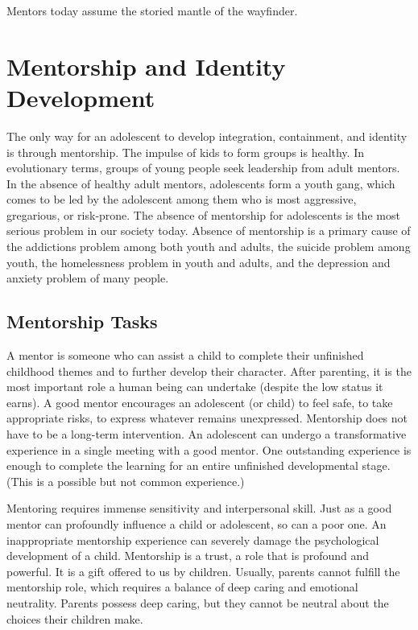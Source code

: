 \documentclass[12pt,DIV9,oneside,headsepline,footsepline]{scrreprt}
\begin{document}
Mentors today assume the storied mantle of the wayfinder. 


\section{Mentorship and Identity Development}

The only way for an adolescent to develop integration, containment,
and identity is through mentorship. The impulse of kids to form groups
is healthy. In evolutionary terms, groups of young people seek
leadership from adult mentors. In the absence of healthy adult
mentors, adolescents form a youth gang, which comes to be led by the
adolescent among them who is most aggressive, gregarious, or
risk-prone. The absence of mentorship for adolescents is the most
serious problem in our society today. Absence of mentorship is a
primary cause of the addictions problem among both youth and adults,
the suicide problem among youth, the homelessness problem in youth and
adults, and the depression and anxiety problem of many people.

\subsection{Mentorship Tasks}

A mentor is someone who can assist a child to complete their
unfinished childhood themes and to further develop their character.
After parenting, it is the most important role a human being can
undertake (despite the low status it earns). A good mentor encourages
an adolescent (or child) to feel safe, to take appropriate risks, to
express whatever remains unexpressed. Mentorship does not have to be a
long-term intervention. An adolescent can undergo a transformative
experience in a single meeting with a good mentor. One outstanding
experience is enough to complete the learning for an entire unfinished
developmental stage. (This is a possible but not common experience.)

Mentoring requires immense sensitivity and interpersonal skill. Just
as a good mentor can profoundly influence a child or adolescent, so
can a poor one. An inappropriate mentorship experience can severely
damage the psychological development of a child. Mentorship is a
trust, a role that is profound and powerful. It is a gift offered to
us by children. Usually, parents cannot fulfill the mentorship role,
which requires a balance of deep caring and emotional neutrality.
Parents possess deep caring, but they cannot be neutral about the
choices their children make.
\end{document}
